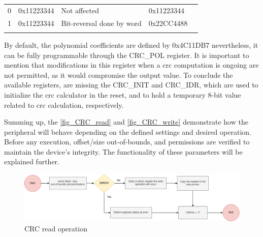 \begin{table}[!htb]
\begin{minipage}{.5\linewidth}
{\begin{tabular}{lllll}
		\multicolumn{1}{|l|}{0} & \multicolumn{1}{l|}{0x11223344} & \multicolumn{1}{l|}{Not affected} & \multicolumn{1}{l|}{0x11223344} &  \\ \cline{1-4}
		\multicolumn{1}{|l|}{1} & \multicolumn{1}{l|}{0x11223344} & \multicolumn{1}{l|}{Bit-reversal done by word} & \multicolumn{1}{l|}{0x22CC4488} &  \\ \cline{1-4}
		 &  &  &  & 
		\end{tabular}%
        }   
        \label{tab:CRC_REV_OUT}
    \end{minipage}
	\label{tab:CRC_REV} 
\end{table}

By default, the polynomial coefficients are defined by 0x4C11DB7 nevertheless, it can be fully programmable through the CRC\_POL register.
It is important to mention that modifications in this register when a \gls{crc} computation is ongoing are not permitted, as it would 
compromise the output value. To conclude the available registers, are missing the CRC\_INIT and CRC\_IDR, which are used to initialize 
the \gls{crc} calculator in the reset, and to hold a temporary 8-bit value related to \gls{crc} calculation, respectively. 

Summing up, the \autoref{fig_CRC_read} and \autoref{fig_CRC_write} demonstrate how the peripheral will behave depending on the defined settings and desired 
operation. Before any execution, offset/size out-of-bounds, and permissions are verified to maintain the device's integrity. The 
functionality of these parameters will be explained further. 

\begin{figure}[H]
	\centering
 	\includegraphics[width=0.8\linewidth]{Images/CRC_read.png} 
 	\caption{CRC read operation}
	 \label{fig_CRC_read}
\end{figure}

